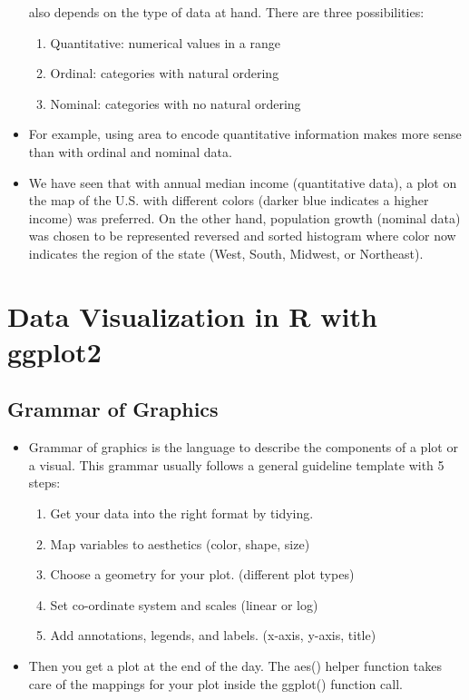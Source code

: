 \begin{itemize}
    also depends on the type of data at hand. There are three possibilities:
    \begin{enumerate}
        \item Quantitative: numerical values in a range
        \item Ordinal: categories with natural ordering
        \item Nominal: categories with no natural ordering
    \end{enumerate}
    \item For example, using area to encode quantitative information makes more sense than
    with ordinal and nominal data. 
    \item We have seen that with annual median income (quantitative data), a plot on the
    map of the U.S. with different colors (darker blue indicates a higher income) was
    preferred. On the other hand, population growth (nominal data) was chosen to be
    represented reversed and sorted histogram where color now indicates the region of the
    state (West, South, Midwest, or Northeast).
\end{itemize}

\section{Data Visualization in R with ggplot2}
\subsection{Grammar of Graphics}
\begin{itemize}
    \item Grammar of graphics is the language to describe the components of a plot or a
    visual. This grammar usually follows a general guideline template with 5 steps:
\begin{enumerate}
    \item Get your data into the right format by tidying. 
    \item Map variables to aesthetics (color, shape, size)
    \item Choose a geometry for your plot. (different plot types)
    \item  Set co-ordinate system and scales (linear or log)
    \item Add annotations, legends, and labels. (x-axis, y-axis, title)
\end{enumerate}
    \item Then you get a plot at the end of the day. The aes() helper function takes care
    of the mappings for your plot inside the ggplot() function call.
\end{itemize}

